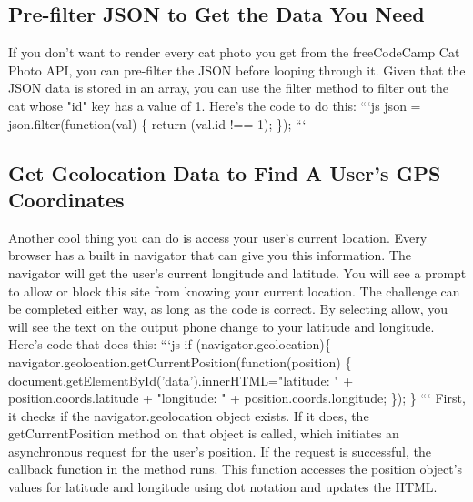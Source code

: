 \documentclass{article}%
\begin{document}
%
\subsection{Pre{-}filter JSON to Get the Data You Need}%
\label{subsec:Pre{-}filterJSONtoGettheDataYouNeed}%
If you don't want to render every cat photo you get from the freeCodeCamp Cat Photo API, you can pre{-}filter the JSON before looping through it.\newline%
Given that the JSON data is stored in an array, you can use the filter method to filter out the cat whose "id" key has a value of 1.\newline%
Here's the code to do this:\newline%
```js\newline%
json = json.filter(function(val) \{\newline%
  return (val.id !== 1);\newline%
\});\newline%
```\newline%

%
\subsection{Get Geolocation Data to Find A User's GPS Coordinates}%
\label{subsec:GetGeolocationDatatoFindAUsersGPSCoordinates}%
Another cool thing you can do is access your user's current location. Every browser has a built in navigator that can give you this information.\newline%
The navigator will get the user's current longitude and latitude.\newline%
You will see a prompt to allow or block this site from knowing your current location. The challenge can be completed either way, as long as the code is correct.\newline%
By selecting allow, you will see the text on the output phone change to your latitude and longitude.\newline%
Here's code that does this:\newline%
```js\newline%
if (navigator.geolocation)\{\newline%
  navigator.geolocation.getCurrentPosition(function(position) \{\newline%
    document.getElementById('data').innerHTML="latitude: " + position.coords.latitude + "longitude: " + position.coords.longitude;\newline%
  \});\newline%
\}\newline%
```\newline%
First, it checks if the navigator.geolocation object exists. If it does, the getCurrentPosition method on that object is called, which initiates an asynchronous request for the user's position. If the request is successful, the callback function in the method runs. This function accesses the position object's values for latitude and longitude using dot notation and updates the HTML.\newline%
\end{document}
